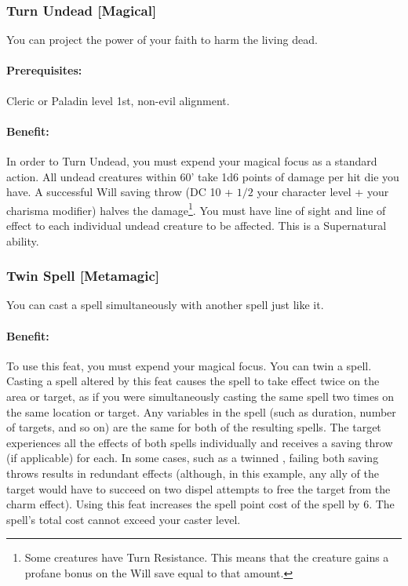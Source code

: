 \subsubsection[Turn Undead]{Turn Undead [Magical]}
\label{Feat:TurnUndead}
You can project the power of your faith to harm the living dead.

\paragraph{Prerequisites:} Cleric or Paladin level 1st, non-evil alignment.

\paragraph{Benefit:} In order to Turn Undead, you must expend your magical focus as a standard action.
All undead creatures within 60' take 1d6 points of damage per hit die you have. 
A successful Will saving throw (DC 10 + $1/2$ your character level + your charisma modifier) halves the damage\footnote{
Some creatures have Turn Resistance. This means that the creature gains a profane bonus on the Will save equal to that amount.}.
You must have line of sight and line of effect to each individual undead creature to be affected. This is a Supernatural ability.
\subsubsection[Twin Spell]{Twin Spell [Metamagic]}
\label{Feat:TwinSpell}
You can cast a spell simultaneously with another spell just like it.

\paragraph{Benefit:} To use this feat, you must expend your magical focus. 
You can twin a spell. Casting a spell altered by this feat causes the spell to take effect twice on the area or target, 
as if you were simultaneously casting the same spell two times on the same location or target. 
Any variables in the spell (such as duration, number of targets, and so on) are the same for both of the resulting spells. 
The target experiences all the effects of both spells individually and receives a saving throw (if applicable) for each. 
In some cases, such as a twinned , failing both saving throws results in redundant effects 
(although, in this example, any ally of the target would have to succeed on two dispel attempts to free the target from the charm effect).
Using this feat increases the spell point cost of the spell by 6. The spell's total cost cannot exceed your caster level.


